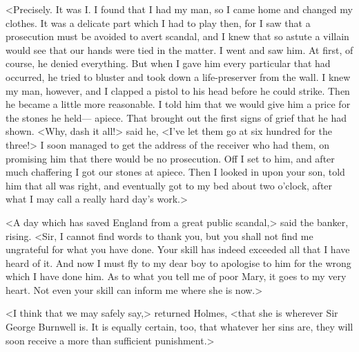 <Precisely. It was I\@. I found that I had my man, so I came home and changed my clothes. It was a delicate part which I had to play then, for I saw that a prosecution must be avoided to avert scandal, and I knew that so astute a villain would see that our hands were tied in the matter. I went and saw him. At first, of course, he denied everything. But when I gave him every particular that had occurred, he tried to bluster and took down a life-preserver from the wall. I knew my man, however, and I clapped a pistol to his head before he could strike. Then he became a little more reasonable. I told him that we would give him a price for the stones he held— apiece. That brought out the first signs of grief that he had shown. <Why, dash it all!> said he, <I've let them go at six hundred for the three!> I soon managed to get the address of the receiver who had them, on promising him that there would be no prosecution. Off I set to him, and after much chaffering I got our stones at  apiece. Then I looked in upon your son, told him that all was right, and eventually got to my bed about two o'clock, after what I may call a really hard day's work.>

<A day which has saved England from a great public scandal,> said the banker, rising. <Sir, I cannot find words to thank you, but you shall not find me ungrateful for what you have done. Your skill has indeed exceeded all that I have heard of it. And now I must fly to my dear boy to apologise to him for the wrong which I have done him. As to what you tell me of poor Mary, it goes to my very heart. Not even your skill can inform me where she is now.>

<I think that we may safely say,> returned Holmes, <that she is wherever Sir George Burnwell is. It is equally certain, too, that whatever her sins are, they will soon receive a more than sufficient punishment.>